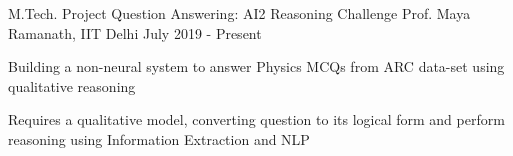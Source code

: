 \begin{cventries}
    \cventry
        {M.Tech. Project} %
        {Question Answering: AI2 Reasoning Challenge} %
        {Prof. Maya Ramanath, IIT Delhi} %
        {July 2019 - Present} %
        {
            \begin{cvitems} %
                \item Building a non-neural system to answer Physics MCQs from ARC data-set using qualitative reasoning
                \item Requires a qualitative model, converting question to its logical form and perform reasoning using Information Extraction and NLP
            \end{cvitems}
        }
    \end{cventries}